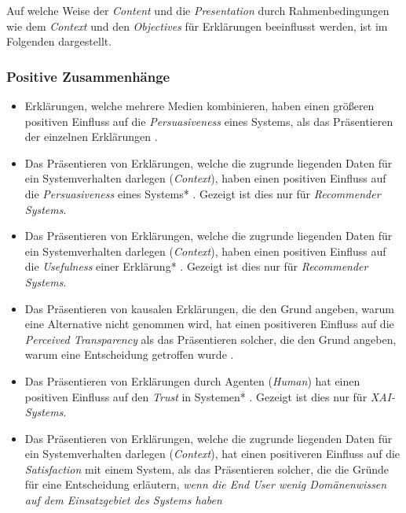 Auf welche Weise der \textit{Content} und die \textit{Presentation} durch Rahmenbedingungen wie dem \textit{Context} und den \textit{Objectives} für Erklärungen beeinflusst werden, ist im Folgenden dargestellt.

\subsubsection*{Positive Zusammenhänge}

\begin{itemize}
    \item Erklärungen, welche mehrere Medien kombinieren, haben einen größeren positiven Einfluss auf die \textit{Persuasiveness} eines Systems, als das Präsentieren der einzelnen Erklärungen  \cite{sato_action-triggering_2019, kunkel_let_2019, sato_action-triggering_2019, schrills_color_2020, lim_2009_assessing}.
    \item Das Präsentieren von Erklärungen, welche die zugrunde liegenden Daten für ein Systemverhalten darlegen (\textit{Context}), haben einen positiven Einfluss auf die \textit{Persuasiveness} eines Systems* \cite{sato_action-triggering_2019, abdulrahman_belief-based_2019}. Gezeigt ist dies nur für \textit{Recommender Systems}.
    \item Das Präsentieren von Erklärungen, welche die zugrunde liegenden Daten für ein Systemverhalten darlegen (\textit{Context}), haben einen positiven Einfluss auf die \textit{Usefulness} einer Erklärung* \cite{sato_action-triggering_2019, abdulrahman_belief-based_2019}. Gezeigt ist dies nur für \textit{Recommender Systems}.
    \item Das Präsentieren von kausalen Erklärungen, die den Grund angeben, warum eine Alternative nicht genommen wird, hat einen positiveren Einfluss auf die \textit{Perceived Transparency} als das Präsentieren solcher, die den Grund angeben, warum eine Entscheidung getroffen wurde \cite{martin_evaluating_2021, schrills_color_2020, neerincx_using_2018}.
    \item Das Präsentieren von Erklärungen durch Agenten (\textit{Human}) hat einen positiven Einfluss auf den \textit{Trust} in Systemen* \cite{weitz_you_2019}. Gezeigt ist dies nur für \textit{XAI-Systems}.
    \item Das Präsentieren von Erklärungen, welche die zugrunde liegenden Daten für ein Systemverhalten darlegen (\textit{Context}), hat einen positiveren Einfluss auf die \textit{Satisfaction} mit einem System, als das Präsentieren solcher, die die Gründe für eine Entscheidung erläutern, \textit{wenn die End User wenig Domänenwissen auf dem Einsatzgebiet des Systems haben} \cite{kaptein_personalised_2017, martin_evaluating_2021}

\end{itemize}
